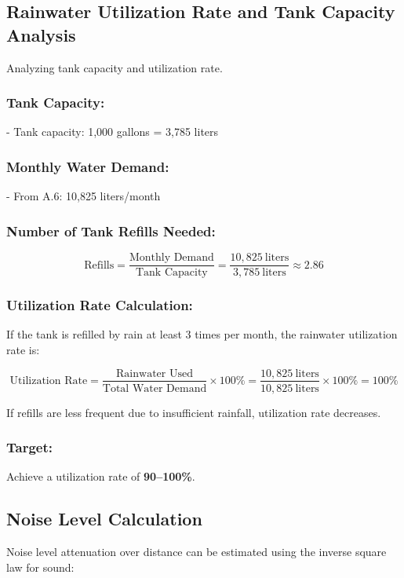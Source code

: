 \documentclass[12pt]{report}
\begin{document}
\subsection{Rainwater Utilization Rate and Tank Capacity Analysis}

Analyzing tank capacity and utilization rate.

\subsubsection{Tank Capacity:}

- Tank capacity: 1,000 gallons = 3,785 liters

\subsubsection{Monthly Water Demand:}

- From A.6: 10,825 liters/month

\subsubsection{Number of Tank Refills Needed:}

\[
\text{Refills} = \frac{\text{Monthly Demand}}{\text{Tank Capacity}} = \frac{10,825\ \text{liters}}{3,785\ \text{liters}} \approx 2.86
\]

\subsubsection{Utilization Rate Calculation:}

If the tank is refilled by rain at least 3 times per month, the rainwater utilization rate is:

\[
\text{Utilization Rate} = \frac{\text{Rainwater Used}}{\text{Total Water Demand}} \times 100\% = \frac{10,825\ \text{liters}}{10,825\ \text{liters}} \times 100\% = 100\%
\]

If refills are less frequent due to insufficient rainfall, utilization rate decreases.

\subsubsection{Target:} Achieve a utilization rate of \textbf{90–100\%}.


\subsection{Noise Level Calculation}
Noise level attenuation over distance can be estimated using the inverse square law for sound:
\end{document}
